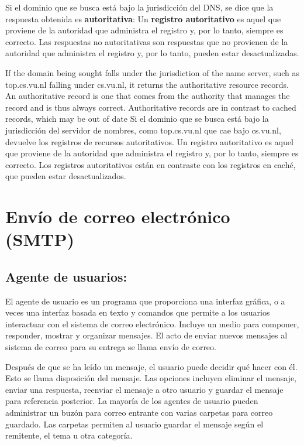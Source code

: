 Si el dominio que se busca está bajo la jurisdicción del DNS, se dice que la respuesta obtenida es \textbf{autoritativa}:  Un \textbf{registro autoritativo} es aquel que proviene de la autoridad que administra el registro y, por lo tanto, siempre es correcto. Las respuestas no autoritativas son respuestas que no provienen de la autoridad que administra el registro y, por lo tanto, pueden estar desactualizadas.

If the domain being sought falls under the jurisdiction of the  
name server, such as top.cs.vu.nl falling under cs.vu.nl, it returns the authoritative  
resource records. An authoritative record is one that comes from the authority  
that manages the record and is thus always correct. Authoritative records are in  
contrast to cached records, which may be out of date 
Si el dominio que se busca está bajo la jurisdicción del servidor de nombres, como top.cs.vu.nl que cae bajo cs.vu.nl, devuelve los registros de recursos autoritativos. Un registro autoritativo es aquel que proviene de la autoridad que administra el registro y, por lo tanto, siempre es correcto. Los registros autoritativos están en contraste con los registros en caché, que pueden estar desactualizados.

\section{Envío de correo electrónico (SMTP)}
\subsection{Agente de usuarios:}
El agente de usuario es un programa que proporciona una interfaz gráfica, o a veces una interfaz basada en texto y comandos que permite a los usuarios interactuar con el sistema de correo electrónico. Incluye un medio para componer, responder, mostrar y organizar mensajes. El acto de enviar nuevos mensajes al sistema de correo para su entrega se llama envío de correo.

Después de que se ha leído un mensaje, el usuario puede decidir qué hacer con él. Esto se llama disposición del mensaje. Las opciones incluyen eliminar el mensaje, enviar una respuesta, reenviar el mensaje a otro usuario y guardar el mensaje para referencia posterior. La mayoría de los agentes de usuario pueden administrar un buzón para correo entrante con varias carpetas para correo guardado. Las carpetas permiten al usuario guardar el mensaje según el remitente, el tema u otra categoría.


